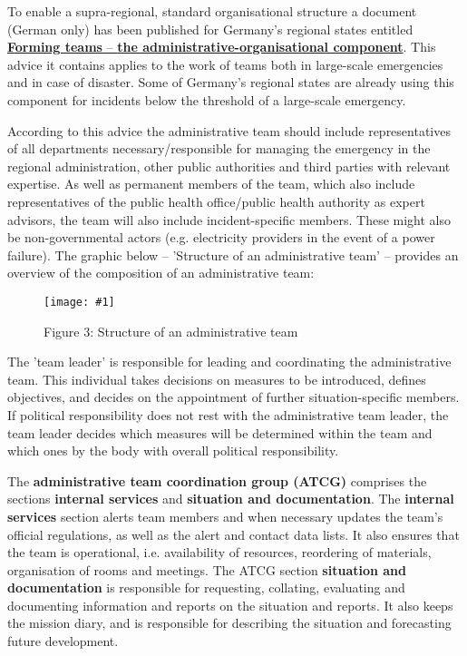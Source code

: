 \documentclass{article}
\newlength{\imgwidth}
\newcommand\scaledgraphics[2]{%
                
\settowidth{\imgwidth}{\texttt{[image: \#1]}}%
                
\setlength{\imgwidth}{\minof{\imgwidth}{#2\textwidth}}%
                
\texttt{[image: \#1]}%
                
}
\begin{document}
To enable a supra-regional, standard organisational structure a document (German only) has been published for Germany's regional states entitled\textbf{ }\textbf{\href{http://www.bbk.bund.de/SharedDocs/Downloads/BBK/DE/FIS/DownloadsRechtundVorschriften/IMKBeschluesse/IMK174TOP26Anlg2.pdf}{Forming teams}}\href{http://www.bbk.bund.de/SharedDocs/Downloads/BBK/DE/FIS/DownloadsRechtundVorschriften/IMKBeschluesse/IMK174TOP26Anlg2.pdf}{ – }\textbf{\href{http://www.bbk.bund.de/SharedDocs/Downloads/BBK/DE/FIS/DownloadsRechtundVorschriften/IMKBeschluesse/IMK174TOP26Anlg2.pdf}{the administrative-organisational component}}. This advice it contains\textbf{ }applies to the work of teams both in large-scale emergencies and in case of disaster. Some of Germany's regional states are already using this component for incidents below the threshold of a large-scale emergency.


According to this advice the administrative team should include representatives of all departments necessary/responsible for managing the emergency in the regional administration, other public authorities and third parties with relevant expertise. As well as permanent members of the team, which also include representatives of the public health office/public health authority as expert advisors, the team will also include incident-specific members. These might also be non-governmental actors (e.g. electricity providers in the event of a power failure). The graphic below – 'Structure of an administrative team' – provides an overview of the composition of an administrative team:

\begin{figure}
\scaledgraphics{80d2b269-76f8-43ca-83a3-e341c4f08917.png}{1}
\caption*{Figure 3: Structure of an administrative team}\label{F10464411}
\end{figure}


The 'team leader' is responsible for leading and coordinating the administrative team. This individual takes decisions on measures to be introduced, defines objectives, and decides on the appointment of further situation-specific members. If political responsibility does not rest with the administrative team leader, the team leader decides which measures will be determined within the team and which ones by the body with overall political responsibility.


The \textbf{administrative team coordination group (ATCG)} comprises the sections \textbf{internal services} and \textbf{situation and documentation}. The \textbf{internal services} section alerts team members and when necessary updates the team's official regulations, as well as the alert and contact data lists. It also ensures that the team is operational, i.e. availability of resources, reordering of materials, organisation of rooms and meetings. The ATCG section \textbf{situation and documentation} is responsible for requesting, collating, evaluating and documenting information and reports on the situation and reports. It also keeps the mission diary, and is responsible for describing the situation and forecasting future development.
\end{document}
